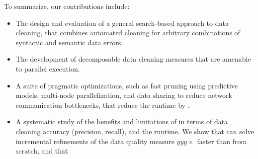 \noindent To summarize, our contributions include:
\begin{itemize}[leftmargin=*, topsep=0mm, itemsep=0mm]
  \item The design and evaluation of a general search-based approach to data cleaning, that combines automated cleaning for arbitrary combinations of syntactic and semantic data errors.
  \item The development of decomposable data cleaning measures that are amenable to parallel execution.
  \item A suite of pragmatic optimizations, such as fast pruning using predictive models, multi-node parallelization, and data sharing to reduce network communication bottlenecks, that reduce the runtime by .
  \item A systematic study of the benefits and limitations of \sys in terms of data cleaning accuracy (precision, recall), and the runtime.  We show that \sys can solve incremental refinements of the data quality measure $yyy\times$ faster than from scratch, and that 
\end{itemize}


